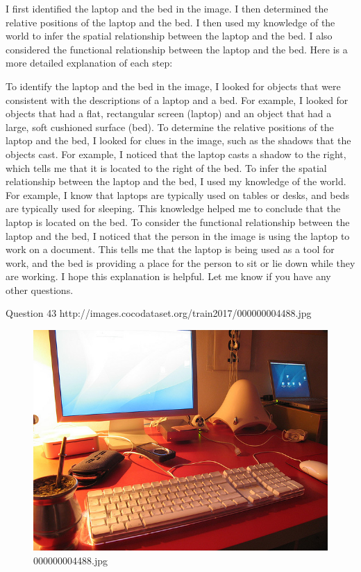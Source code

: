 \begin{enumerate}
    I first identified the laptop and the bed in the image.
    I then determined the relative positions of the laptop and the bed.
    I then used my knowledge of the world to infer the spatial relationship between the laptop and the bed.
    I also considered the functional relationship between the laptop and the bed.
    Here is a more detailed explanation of each step:
    
    To identify the laptop and the bed in the image, I looked for objects that were consistent with the descriptions of a laptop and a bed. For example, I looked for objects that had a flat, rectangular screen (laptop) and an object that had a large, soft cushioned surface (bed).
    To determine the relative positions of the laptop and the bed, I looked for clues in the image, such as the shadows that the objects cast. For example, I noticed that the laptop casts a shadow to the right, which tells me that it is located to the right of the bed.
    To infer the spatial relationship between the laptop and the bed, I used my knowledge of the world. For example, I know that laptops are typically used on tables or desks, and beds are typically used for sleeping. This knowledge helped me to conclude that the laptop is located on the bed.
    To consider the functional relationship between the laptop and the bed, I noticed that the person in the image is using the laptop to work on a document. This tells me that the laptop is being used as a tool for work, and the bed is providing a place for the person to sit or lie down while they are working.
    I hope this explanation is helpful. Let me know if you have any other questions.
\end{enumerate}
Question 43
http://images.cocodataset.org/train2017/000000004488.jpg
\begin{figure}[h]
    \centering
    \includegraphics[width=0.8\linewidth]{../image set/hard/000000004488.jpg}
    \caption{000000004488.jpg}
\end{figure}
